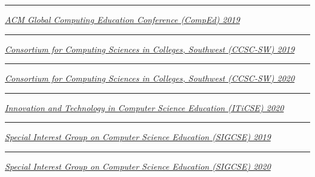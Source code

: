 \documentclass[margin,line]{res}
\begin{document}
\begin{resume}
\rule{-1mm}{5mm} \hspace*{4mm} \href{http://www.acmcomped.org/}{\textit{ACM Global Computing Education Conference (CompEd) 2019}}\\
\rule{-1mm}{5mm} \hspace*{4mm} \href{http://www.ccsc.org/southwestern/2019/index.php}{\textit{Consortium for Computing Sciences in Colleges, Southwest (CCSC-SW) 2019}}\\
\rule{-1mm}{5mm} \hspace*{4mm} \href{http://www.ccsc.org/southwestern/2020/index.php}{\textit{Consortium for Computing Sciences in Colleges, Southwest (CCSC-SW) 2020}}\\
\rule{-1mm}{5mm} \hspace*{4mm} \href{https://iticse.acm.org/}{\textit{Innovation and Technology in Computer Science Education (ITiCSE) 2020}}\\
\rule{-1mm}{5mm} \hspace*{4mm} \href{https://sigcse2019.sigcse.org/}{\textit{Special Interest Group on Computer Science Education (SIGCSE) 2019}}\\
\rule{-1mm}{5mm} \hspace*{4mm} \href{https://sigcse2020.sigcse.org/}{\textit{Special Interest Group on Computer Science Education (SIGCSE) 2020}}\\


\end{resume}
\end{document}
